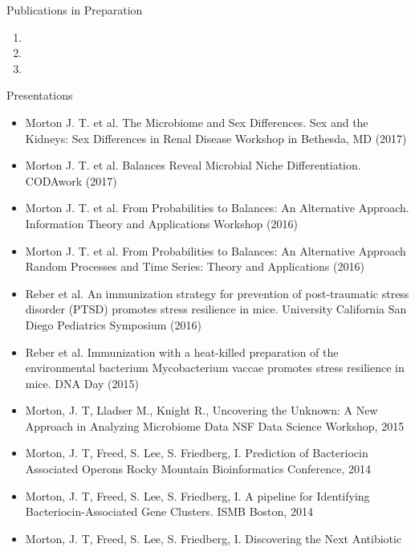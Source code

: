 \documentclass{resume} %
\begin{document}
\begin{rSection}{Publications in Preparation}
  \begin{enumerate}
    \item {}
    \item {}
    \item {}
  \end{enumerate}
\end{rSection}

\begin{rSection}{Presentations}
  \begin{itemize}
    \setlength\itemsep{0em}
    \item  Morton J. T. et al. The Microbiome and Sex Differences.
           Sex and the Kidneys: Sex Differences in Renal Disease Workshop in Bethesda, MD (2017)
    \item  Morton J. T. et al. Balances Reveal Microbial Niche Differentiation. CODAwork (2017)
    \item  Morton J. T. et al. From Probabilities to Balances: An Alternative Approach. Information Theory and Applications Workshop (2016)
    \item  Morton J. T. et al. From Probabilities to Balances: An Alternative Approach Random Processes and Time Series: Theory and Applications (2016)
    \item  Reber et al. An immunization strategy for prevention of post-traumatic stress disorder (PTSD) promotes stress resilience in mice.
                 University California San Diego Pediatrics Symposium  (2016)
    \item  Reber et al. Immunization with a heat-killed preparation of the environmental bacterium Mycobacterium vaccae
                promotes stress resilience in mice. DNA Day (2015)
    \item   Morton, J. T, Lladser M., Knight R., Uncovering the Unknown: A New Approach in
                Analyzing Microbiome Data NSF Data Science Workshop, 2015
    \item   Morton, J. T, Freed, S. Lee, S. Friedberg, I. Prediction of Bacteriocin Associated Operons
                Rocky Mountain Bioinformatics Conference, 2014
    \item   Morton, J. T, Freed, S. Lee, S. Friedberg, I. A pipeline for Identifying Bacteriocin-Associated
                Gene Clusters. ISMB Boston, 2014
    \item   Morton, J. T, Freed, S. Lee, S. Friedberg, I. Discovering the Next Antibiotic

\end{itemize}
\end{rSection}
\end{document}
